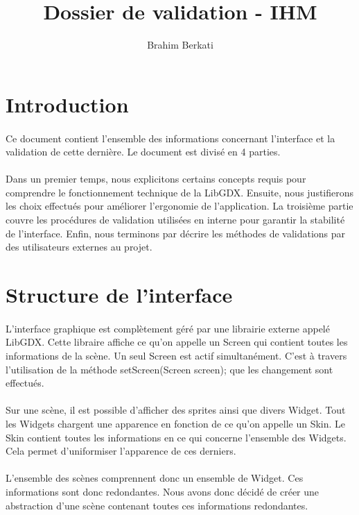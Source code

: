 \documentclass[11pt]{article} %
\title{Dossier de validation - IHM}
\author{Brahim Berkati}
\begin{document}
\maketitle

\section{Introduction}
\paragraph{}
Ce document contient l'ensemble des informations concernant l'interface et la validation de cette dernière. Le document est divisé en 4 parties.
\paragraph{}
Dans un premier temps, nous explicitons certains concepts requis pour comprendre le fonctionnement technique de la LibGDX. Ensuite, nous justifierons les choix effectués pour améliorer l'ergonomie de l'application. La troisième partie couvre les procédures de validation utilisées en interne pour garantir la stabilité de l'interface. Enfin, nous terminons par décrire les méthodes de validations par des utilisateurs externes au projet.

\section{Structure de l'interface}
\paragraph{}
L'interface graphique est complètement géré par une librairie externe appelé LibGDX. Cette libraire affiche ce qu'on appelle un Screen qui contient toutes les informations de la scène. Un seul Screen est actif simultanément. C'est à travers l'utilisation de la méthode setScreen(Screen screen); que les changement sont effectués.
\paragraph{}
Sur une scène, il est possible d'afficher des sprites ainsi que divers Widget. Tout les Widgets chargent une apparence en fonction de ce qu'on appelle un Skin. Le Skin contient toutes les informations en ce qui concerne l'ensemble des Widgets. Cela permet d'uniformiser l'apparence de ces derniers.
\paragraph{}
L'ensemble des scènes comprennent donc un ensemble de Widget. Ces informations sont donc redondantes. Nous avons donc décidé de créer une abstraction d'une scène contenant toutes ces informations redondantes.
\end{document}
